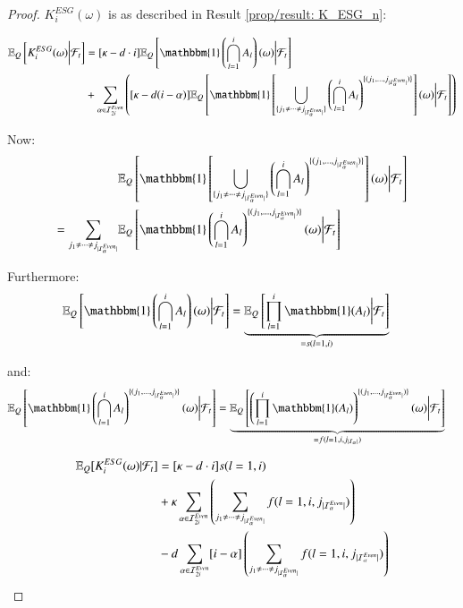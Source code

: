 \begin{proof}

$K_{i}^{ESG}(\omega)$ is as described in Result \ref{prop/result: K_ESG_n}: 

\begin{align*}
\E_{Q}\left[K_{i}^{ESG}(\omega)
\bigg{|}\F_{t}\right]
&= 
[\kappa - d\cdot i]\E_{Q}\left[
\mathbbm{1}\left(
\bigcap_{l=1}^{i}A_{l}
\right)(\omega)\bigg{|}\F_{t}
\right] \\ 
&+
\sum_{\alpha \in \mathcal{I}_{2i}^{Even}}
\left(
[\kappa - d(i-\alpha)]
\E_{Q}\left[
\mathbbm{1}\left[
\bigcup_{\{
j_{1}\neq \dots \neq j_{|\mathcal{I}_{\alpha}^{Even}|}
\}
}
\left(
\bigcap_{l=1}^{i}
A_{l}
\right)
^{
\{
(j_{1}, \dots , j_{|\mathcal{I}_{\alpha}^{Even}|})
\}
}
\right](\omega)
\bigg{|}\F_{t}
\right]
\right)
\end{align*}

Now: 
\begin{align*}
&\E_{Q}\left[
\mathbbm{1}\left[
\bigcup_{\{
j_{1}\neq \dots \neq j_{|\mathcal{I}_{\alpha}^{Even}|}
\}
}
\left(
\bigcap_{l=1}^{i}
A_{l}
\right)^{
\{
(j_{1}, \dots , j_{|\mathcal{I}_{\alpha}^{Even}|})
\}
}
\right](\omega)
\bigg{|}\F_{t}
\right] \\
= 
\sum_{
j_{1}\neq \dots \neq j_{|\mathcal{I}_{\alpha}^{Even}|}
}
&\E_{Q}\left[
\mathbbm{1}\left(
\bigcap_{l=1}^{i}A_{l}
\right)^{
\{
(j_{1}, \dots, j_{|\mathcal{I}_{\alpha}^{Even}|})
\}
}
(\omega)
\bigg{|}\F_{t}
\right]
\end{align*}

Furthermore: 
\begin{align*}
\E_{Q}\left[
\mathbbm{1}\left(
\bigcap_{l=1}^{i}A_{l}
\right)(\omega)\bigg{|}\F_{t}
\right] 
&= \underbrace{
\E_{Q}\left[
\prod_{l=1}^{i}\mathbbm{1}(A_{l})\bigg{|}\F_{t}
\right]
}_{= s(l=1, i)}
\end{align*}

and:
\begin{align*}
\E_{Q}\left[
\mathbbm{1}\left(
\bigcap_{l=1}^{i}A_{l}
\right)^{
\{
(j_{1}, \dots, j_{|\mathcal{I}_{\alpha}^{Even}|})
\}
}(\omega)
\bigg{|}\F_{t}
\right] 
&= \underbrace{
\E_{Q}\left[
\left(
\prod_{l=1}^{i}\mathbbm{1}(A_{l})
\right)^{
\{
(j_{1}, \dots, j_{|\mathcal{I}_{\alpha}^{Even}|})
\}
}
(\omega)
\bigg{|}\F_{t}
\right]
}_{= f(l=1, i, j_{|\mathcal{I}_{\alpha}|})}
\end{align*}

\begin{align*}
\mathbb{E}_{Q}[K_{i}^{ESG}(\omega)|\mathcal{F}_{t}]
&= 
[\kappa -d\cdot i]s(l=1,i) \\
&+ 
\kappa \sum_{\alpha \in \mathcal{I}_{2i}^{Even}}
\left(
\sum_{
j_{1}\neq \dots \neq j_{|\mathcal{I}_{\alpha}^{Even}|}
}
f(l=1, i, j_{|\mathcal{I}_{\alpha}^{Even}|})
\right)
\\ 
&-
d\sum_{\alpha \in \mathcal{I}_{2i}^{Even}}
[i-\alpha]
\left(
\sum_{
j_{1}\neq \dots \neq j_{|\mathcal{I}_{\alpha}^{Even}|}
}
f(l=1, i, j_{|\mathcal{I}_{\alpha}^{Even}|})
\right)
\end{align*}


\end{proof}
